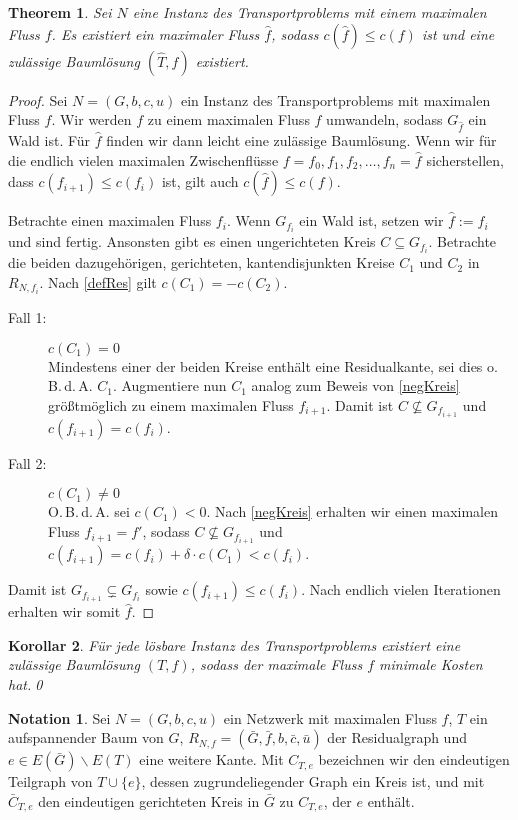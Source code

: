 \documentclass[a4paper,twoside,ngerman]{report}
\theoremstyle{plain}
\newtheorem{thm}{Theorem}
\newtheorem{kor}[thm]{Korollar}
\theoremstyle{definition}
\newtheorem*{nota}{Notation}
\newcommand{\obda}{o.\,B.\,d.\,A. }
\newcommand{\Obda}{O.\,B.\,d.\,A. }
\begin{document}
\begin{thm}\label{BLex}Sei $N$ eine Instanz des Transportproblems mit einem maximalen Fluss $f$. Es existiert ein maximaler Fluss $\hat{f}$, sodass $c(\hat{f})\leq c(f)$ ist und eine zulässige Baumlösung $(\hat{T},\hat{f})$ existiert.\end{thm}
\begin{proof}Sei $N=(G,b,c,u)$ ein Instanz des Transportproblems mit maximalen Fluss $f$. Wir werden $f$ zu einem maximalen Fluss $\hat{f}$ umwandeln, sodass $G_{\hat{f}}$ ein Wald ist. Für $\hat{f}$ finden wir dann leicht eine zulässige Baumlösung. Wenn wir für die endlich vielen maximalen Zwischenflüsse $f=f_0,f_1,f_2,\ldots,f_n=\hat{f}$ sicherstellen, dass $c(f_{i+1})\leq c(f_i)$ ist, gilt auch $c(\hat{f})\leq c(f)$.

Betrachte einen maximalen Fluss $f_i$. Wenn $G_{f_i}$ ein Wald ist, setzen wir $\hat{f}:=f_i$ und sind fertig. Ansonsten gibt es einen ungerichteten Kreis $C\subseteq G_{f_i}$. Betrachte die beiden dazugehörigen, gerichteten, kantendisjunkten Kreise $C_1$ und $C_2$ in $R_{N,f_i}$. Nach \cref{defRes} gilt $c(C_1)=-c(C_2)$.
\begin{description}
\item[Fall 1:] $c(C_1)=0$\\
	Mindestens einer der beiden Kreise enthält eine Residualkante, sei dies \obda $C_1$. Augmentiere nun $C_1$ analog zum Beweis von \cref{negKreis} größtmöglich zu einem maximalen Fluss $f_{i+1}$. Damit ist $C\nsubseteq G_{f_{i+1}}$ und $c(f_{i+1}) = c(f_i)$.
\item[Fall 2:] $c(C_1)\neq0$\\
	\Obda sei $c(C_1)<0$. Nach \cref{negKreis} erhalten wir einen maximalen Fluss $f_{i+1}=f'$, sodass $C\nsubseteq G_{f_{i+1}}$ und $c(f_{i+1}) = c(f_i) + \delta\cdot c(C_1)<c(f_i)$.
\end{description}

Damit ist $G_{f_{i+1}}\subsetneq G_{f_i}$ sowie $c(f_{i+1})\leq c(f_i)$. Nach endlich vielen Iterationen erhalten wir somit $\hat{f}$.
\end{proof}

\begin{kor}\label{TP}Für jede lösbare Instanz des Transportproblems existiert eine zulässige Baumlösung $(T,f)$, sodass der maximale Fluss $f$ minimale Kosten hat.\qed\end{kor}

\begin{nota}Sei $N=(G,b,c,u)$ ein Netzwerk mit maximalen Fluss $f$, $T$ ein aufspannender Baum von $G$, $R_{N,f}=(\bar{G},\bar{f},b,\bar{c},\bar{u})$ der Residualgraph und $e\in E(\bar{G})\backslash E(T)$ eine weitere Kante. Mit $C_{T,e}$ bezeichnen wir den eindeutigen Teilgraph von $T\cup\{e\}$, dessen zugrundeliegender Graph ein Kreis ist, und mit  $\bar{C}_{T,e}$ den eindeutigen gerichteten Kreis in $\bar{G}$ zu $C_{T,e}$, der $e$ enthält.\end{nota}
\end{document}
